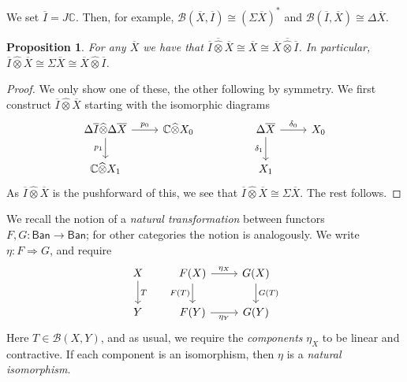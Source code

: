 \documentclass[a4paper,11pt]{article}
\theoremstyle{plain}
\newtheorem{proposition}{Proposition}[section]
\theoremstyle{remark}
\newcommand{\mc}[1]{\mathcal{#1}}
\newcommand{\msf}[1]{\mathsf{#1}}
\newcommand{\proten}{\widehat\otimes}
\begin{document}
We set $\overline I = J\mathbb C$.  Then, for example, $\mc B(\overline X,\overline I) \cong(\Sigma\overline X)^*$ and $\mc B(\overline I, \overline X) \cong \Delta\overline X$.

\begin{proposition}\label{prop:tensor_unit}
For any $\overline X$ we have that $\overline I \overline\proten \overline X \cong \overline X \cong \overline X \overline\proten \overline I$.  In particular, $\overline I \proten \overline X \cong \Sigma \overline X \cong \overline X \proten \overline I$.
\end{proposition}
\begin{proof}
We only show one of these, the other following by symmetry.  We first construct $\overline I \proten \overline X$ starting with the isomorphic diagrams
\[ \begin{tikzcd}
\Delta\overline I \proten \Delta\overline X \arrow[r, "p_0"] \arrow[d, "p_1"'] & \mathbb C \proten X_0  & &
\Delta\overline X \arrow[r, "\delta_0"] \arrow[d, "\delta_1"']  & X_0
\\
\mathbb C\proten X_1  & & &  X_1
\end{tikzcd} \]
As $\overline I \proten \overline X$ is the pushforward of this, we see that $\overline I \proten \overline X \cong \Sigma\overline X$.  The rest follows.
\end{proof}

We recall the notion of a \emph{natural transformation} between functors $F,G\colon \msf{Ban} \to \msf{Ban}$; for other categories the notion is analogously.  We write $\eta \colon F \Rightarrow G$, and require
\[ \begin{tikzcd}
X \arrow[d, "T"]    &
F(X) \arrow[r, "\eta_X"] \arrow[d, "F(T)"'] & G(X) \arrow[d, "G(T)"]
\\
Y    &
F(Y) \arrow[r, "\eta_Y"']  & G(Y)  
\end{tikzcd} \]
Here $T\in\mc B(X,Y)$, and as usual, we require the \emph{components} $\eta_X$ to be linear and contractive.  If each component is an isomorphism, then $\eta$ is a \emph{natural isomorphism}.
\end{document}
